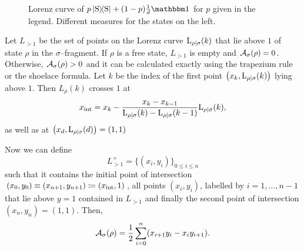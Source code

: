 \begin{figure}[t]%
    \centering
    \hspace{8pt}%
    \caption{ Lorenz curve of $p\ketbra{\rm{S}} + (1-p) \frac{1}{d}\id$ for $p$ given in the legend. Different measures for the states on the left. \\
    }%
    \label{fig:test}
\end{figure}

Let $L_{>1}$ be the set of points on the Lorenz curve ${{\rm{L}}_{\rho|\sigma}}(k)$ that lie above $1$ of state $\rho$ in the $\sigma$--fragment. 
If $\rho$ is a free state, $L_{>1}$ is empty and ${\mathcal A}_\sigma(\rho) = 0$. 
Otherwise, ${\mathcal A}_\sigma(\rho) > 0$ and it can be calculated exactly using the trapezium rule or the shoelace formula. 
Let $k$ be the index of the first point $\left(x_k, {{\rm{L}}_{\rho|\sigma}}(k)\right)$ lying above $1$. 
Then $L_\rho(k)$ crosses $1$ at
\begin{equation}
	x_{\rm{int}} = x_k - \frac{x_k - x_{k-1}}{\lc{\rho}{\sigma}(k) - \lc{\rho}{\sigma}(k-1)}\lc{\rho}{\sigma}(k),\vspace{10pt}
\end{equation}
as well as at $\left(x_d, {{\rm{L}}_{\rho|\sigma}}(d)\right) = (1,1)$

Now we can define
\begin{equation}
L_{>1}^+ = \{ (x_i, y_i) \}_{0 \leq i \leq n}
\end{equation}
such that it contains the initial point of intersection $(x_0, y_0) \equiv (x_{n+1}, y_{n+1}) \coloneqq (x_{\rm{int}}, 1)$, all points $(x_i, y_i)$, labelled by $i=1,\dots,n-1$ that lie above $y=1$ contained in $L_{>1}$ and finally the second point of intersection $(x_n, y_n) = (1,1)$.
Then, 
\begin{equation}
	{\mathcal A}_\sigma(\rho) = \frac{1}{2} \sum\limits_{i=0}^n (x_{i+1} y_i - x_i y_{i+1}).
\end{equation}

